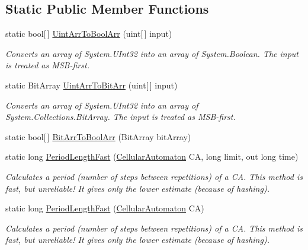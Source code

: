 \subsection*{Static Public Member Functions}
\begin{DoxyCompactItemize}
\item 
static bool\mbox{[}$\,$\mbox{]} \hyperlink{class_cellular_1_1_utilities_a6f1fcc096938174c779453fb588cbfdb}{Uint\+Arr\+To\+Bool\+Arr} (uint\mbox{[}$\,$\mbox{]} input)
\begin{DoxyCompactList}\small\item\em Converts an array of {\ttfamily System.\+U\+Int32} into an array of {\ttfamily System.\+Boolean}. The input is treated as M\+S\+B-\/first. \end{DoxyCompactList}\item 
static Bit\+Array \hyperlink{class_cellular_1_1_utilities_a3e6d6ebde1b445f03d3c0b1a9c0274e6}{Uint\+Arr\+To\+Bit\+Arr} (uint\mbox{[}$\,$\mbox{]} input)
\begin{DoxyCompactList}\small\item\em Converts an array of {\ttfamily System.\+U\+Int32} into an array of {\ttfamily System.\+Collections.\+Bit\+Array}. The input is treated as M\+S\+B-\/first. \end{DoxyCompactList}\item 
static bool\mbox{[}$\,$\mbox{]} \hyperlink{class_cellular_1_1_utilities_a1c47a345afd4e991876f6ae6c4723591}{Bit\+Arr\+To\+Bool\+Arr} (Bit\+Array bit\+Array)
\item 
static long \hyperlink{class_cellular_1_1_utilities_a8ebd90cf7f8d6ce2235d26f9feeddfae}{Period\+Length\+Fast} (\hyperlink{class_cellular_1_1_cellular_automaton}{Cellular\+Automaton} C\+A, long limit, out long time)
\begin{DoxyCompactList}\small\item\em Calculates a period (number of steps between repetitions) of a C\+A. This method is fast, but unreliable! It gives only the lower estimate (because of hashing). \end{DoxyCompactList}\item 
static long \hyperlink{class_cellular_1_1_utilities_a7a43545f264bf30884c8486a14fb4f43}{Period\+Length\+Fast} (\hyperlink{class_cellular_1_1_cellular_automaton}{Cellular\+Automaton} C\+A)
\begin{DoxyCompactList}\small\item\em Calculates a period (number of steps between repetitions) of a C\+A. This method is fast, but unreliable! It gives only the lower estimate (because of hashing). \end{DoxyCompactList}\item 

\end{DoxyCompactItemize}

